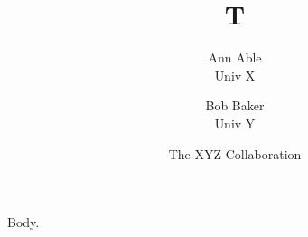 \documentclass{article}
\begin{document}
\title{T}
\author{Ann Able \\ Univ X \and Bob Baker \\ Univ Y \and The XYZ Collaboration}
\maketitle
Body.
\end{document}
